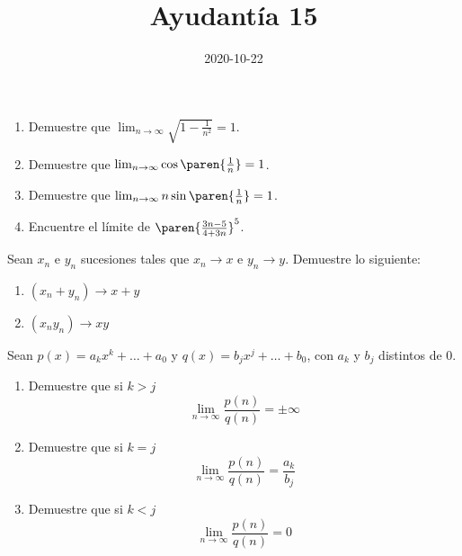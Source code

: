 \documentclass{ayudantia}
\title{Ayudantía 15}
\date{2020-10-22}
\begin{document}
\maketitle


\begin{prob}
    \begin{enumerate}[label=(\alph*)]
        \item Demuestre que \(\lim_{n\rightarrow\infty}\sqrt{1-\frac1{n^2}}=1\).
        \item Demuestre que \(\lim_{n\rightarrow\infty}\cos\paren{\frac1n}=1\).
        \item Demuestre que \(\lim_{n\rightarrow\infty}n\sin\paren{\frac1n}=1\).
        \item Encuentre el límite de \(\paren{\frac{3n-5}{4+3n}}^5\).
    \end{enumerate}
\end{prob}

\begin{ans}
    \begin{sol}

    \end{sol}
\end{ans}


\begin{prob}
    Sean \(x_n\) e \(y_n\) sucesiones tales que \(x_n\rightarrow x\) e \(y_n\rightarrow y\). Demuestre lo siguiente:
    \begin{enumerate}[label=(\alph*)]
        \item \((x_n+y_n)\rightarrow x+y\)
        \item \((x_ny_n)\rightarrow xy\)
    \end{enumerate}
\end{prob}

\begin{ans}
    \begin{sol}

    \end{sol}
\end{ans}


\begin{prob}
    Sean \(p(x)=a_kx^k+\ldots+a_0\) y \(q(x)=b_jx^j+\ldots+b_0\), con \(a_k\) y \(b_j\) distintos de \(0\).
    \begin{enumerate}
        \item Demuestre que si \(k>j\)
        \begin{equation*}
            \lim_{n\rightarrow\infty}\frac{p(n)}{q(n)}=\pm\infty
        \end{equation*}
        \item Demuestre que si \(k=j\)
        \begin{equation*}
            \lim_{n\rightarrow\infty}\frac{p(n)}{q(n)}=\frac{a_k}{b_j}
        \end{equation*}
        \item Demuestre que si \(k<j\)
        \begin{equation*}
            \lim_{n\rightarrow\infty}\frac{p(n)}{q(n)}=0
        \end{equation*}
    \end{enumerate}
\end{prob}
\end{document}
